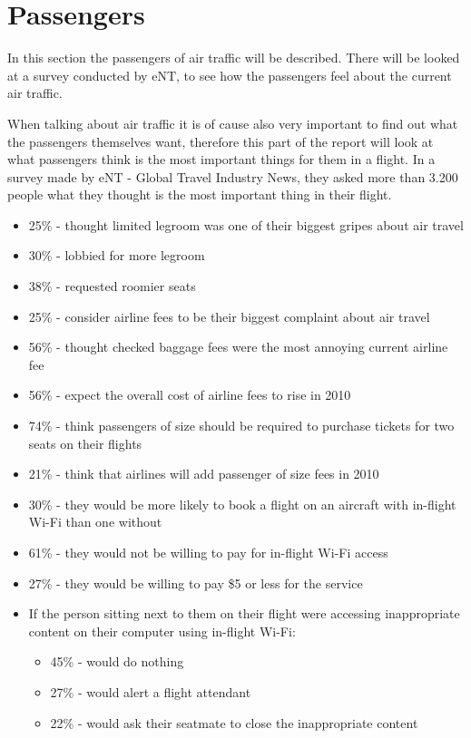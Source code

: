 \section{Passengers}

In this section the passengers of air traffic will be described. There will be looked at a survey conducted by eNT, to see how the passengers feel about the current air traffic.

When talking about air traffic it is of cause also very important to find out what the passengers themselves want, therefore this part of the report will look at what passengers think is the most important things for them in a flight.
In a survey made by eNT - Global Travel Industry News, they asked more than 3.200 people what they thought is the most important thing in their flight.
\begin{itemize}
\item 25\% - thought limited legroom was one of their biggest gripes about air travel
\item 30\% - lobbied for more legroom
\item 38\% - requested roomier seats
\item 25\% - consider airline fees to be their biggest complaint about air travel
\item 56\% - thought checked baggage fees were the most annoying current airline fee
\item 56\% - expect the overall cost of airline fees to rise in 2010
\item 74\% - think passengers of size should be required to purchase tickets for two seats on their flights
\item 21\% - think that airlines will add passenger of size fees in 2010
\item 30\% - they would be more likely to book a flight on an aircraft with in-flight Wi-Fi than one without
\item 61\% - they would not be willing to pay for in-flight Wi-Fi access
\item 27\% - they would be willing to pay \$5 or less for the service
\item If the person sitting next to them on their flight were accessing inappropriate content on their computer using in-flight Wi-Fi:
\begin{itemize}
\item 45\% - would do nothing
\item 27\% - would alert a flight attendant
\item 22\% - would ask their seatmate to close the inappropriate content

\end{itemize}
\end{itemize}
